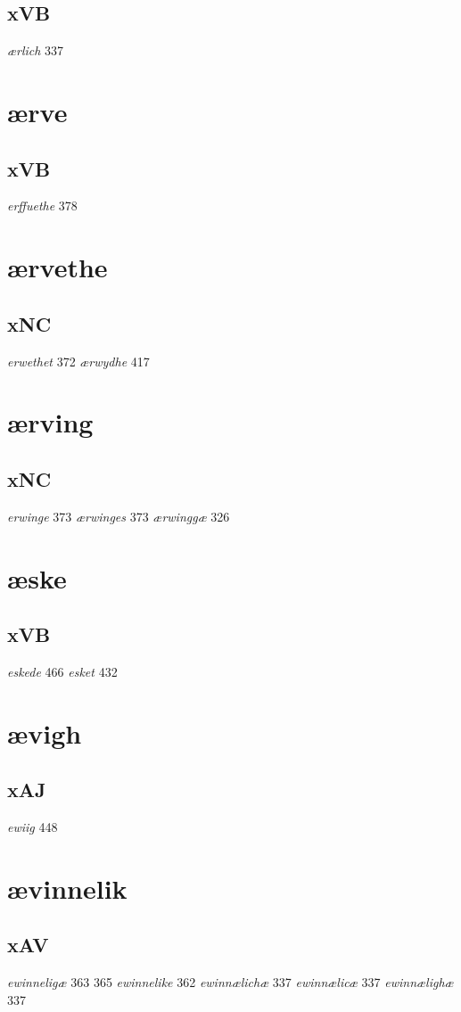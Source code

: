 \documentclass[a4paper,twocolumn]{article}
\begin{document}
\subsection{xVB}
\label{sec:org81bc0db}
\emph{ærlich} 337 
\section{ærve}
\label{sec:org72bbc16}
\subsection{xVB}
\label{sec:org31aea6d}
\emph{erffuethe} 378 
\section{ærvethe}
\label{sec:org0e02966}
\subsection{xNC}
\label{sec:org7224cc7}
\emph{erwethet} 372 \emph{ærwydhe} 417 
\section{ærving}
\label{sec:orge2a47cb}
\subsection{xNC}
\label{sec:orgf07cedd}
\emph{erwinge} 373 \emph{ærwinges} 373 \emph{ærwinggæ} 326 
\section{æske}
\label{sec:org4ff86c2}
\subsection{xVB}
\label{sec:orgbe0dbca}
\emph{eskede} 466 \emph{esket} 432 
\section{ævigh}
\label{sec:org5301c0a}
\subsection{xAJ}
\label{sec:org1e30d0d}
\emph{ewiig} 448 
\section{ævinnelik}
\label{sec:org72f9e07}
\subsection{xAV}
\label{sec:org0d8e4a4}
\emph{ewinneligæ} 363 365 \emph{ewinnelike} 362 \emph{ewinnælichæ} 337 \emph{ewinnælicæ} 337 \emph{ewinnælighæ} 337 
\end{document}

